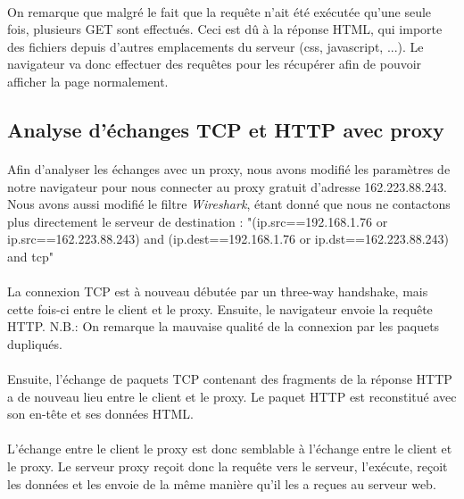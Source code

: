 \paragraph{}
On remarque que malgré le fait que la requête n'ait été exécutée qu'une seule fois, plusieurs GET sont effectués. Ceci est dû à la réponse HTML, qui importe des fichiers depuis d'autres emplacements du serveur (css, javascript, ...). Le navigateur va donc effectuer des requêtes pour les récupérer afin de pouvoir afficher la page normalement. \linebreak
\subsection{Analyse d'échanges TCP et HTTP avec proxy}
\paragraph{}
Afin d'analyser les échanges avec un proxy, nous avons modifié les paramètres de notre navigateur pour nous connecter au proxy gratuit d'adresse 162.223.88.243. Nous avons aussi modifié le filtre \textit{Wireshark}, étant donné que nous ne contactons plus directement le serveur de destination : "(ip.src==192.168.1.76 or ip.src==162.223.88.243) and (ip.dest==192.168.1.76 or ip.dst==162.223.88.243) and tcp"\linebreak
\paragraph{}
La connexion TCP est à nouveau débutée par un three-way handshake, mais cette fois-ci entre le client et le proxy.
Ensuite, le navigateur envoie la requête HTTP. N.B.: On remarque la mauvaise qualité de la connexion par les paquets dupliqués.\linebreak
\paragraph{}
Ensuite, l'échange de paquets TCP contenant des fragments de la réponse HTTP a de nouveau lieu entre le client et le proxy. Le paquet HTTP est reconstitué avec son en-tête et ses données HTML.
\paragraph{}
L'échange entre le client le proxy est donc semblable à l'échange entre le client et le proxy. Le serveur proxy reçoit donc la requête vers le serveur, l'exécute, reçoit les données et les envoie de la même manière qu'il les a reçues au serveur web.

